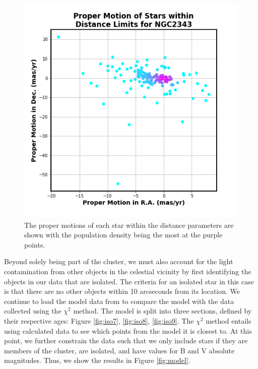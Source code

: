 \documentclass[linenumbers]{aastex631}
\begin{document}
\begin{figure}
    \centering
    \includegraphics[scale = 0.5]{pngs/proper_motion_in_dists.png}
    \caption{\label{fig:pm} The proper motions of each star within the distance parameters are shown with the population density being the most at the purple points.}
    \label{fig:pm}
\end{figure}

Beyond solely being part of the cluster, we must also account for the light contamination from other objects in the celestial vicinity by first identifying the objects in our data that are isolated. The criteria for an isolated star in this case is that there are no other objects within 10 arcseconds from its location. We continue to load the model data from \citet{2012MNRAS.427..127B} to compare the model with the data collected using the $\chi^{2}$ method. The model is split into three sections, defined by their respective ages: Figure \ref{fig:iso7}, \ref{fig:iso8}, \ref{fig:iso9}. The $\chi^{2}$ method entails using calculated data to see which points from the model it is closest to. At this point, we further constrain the data such that we only include stars if they are members of the cluster, are isolated, and have values for B and V absolute magnitudes. Thus, we show the results in Figure \ref{fig:model}.
\end{document}
